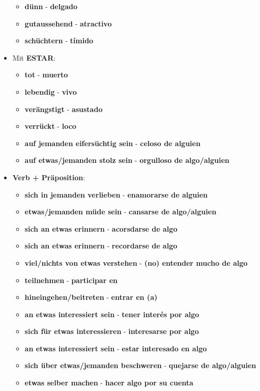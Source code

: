 \documentclass{article}
\begin{document}
\begin{multicols}{2}
\begin{itemize}
\begin{itemize}
			\item{\textbf{dünn} - \textbf{delgado}}
			\item{\textbf{gutaussehend} - \textbf{atractivo}}
			\item{\textbf{schüchtern} - \textbf{tímido}}
		\end{itemize}
		\item{Mit \textbf{ESTAR}:}
		\begin{itemize}
			\item{\textbf{tot} - \textbf{muerto}}
			\item{\textbf{lebendig} - \textbf{vivo}}
			\item{\textbf{verängstigt} - \textbf{asustado}}
			\item{\textbf{verrückt} - \textbf{loco}}
			\item{\textbf{auf jemanden eifersüchtig sein} - \textbf{celoso de alguien}}
			\item{\textbf{auf etwas/jemanden stolz sein} - \textbf{orgulloso de algo/alguien}}
		\end{itemize}
		\newpage
		\item{\textbf{Verb + Präposition}:}
		\begin{itemize}
			\item{\textbf{sich in jemanden verlieben} - \textbf{enamorarse de alguien}}
			\item{\textbf{etwas/jemanden müde sein} - \textbf{cansarse de algo/alguien}}
			\item{\textbf{sich an etwas erinnern} - \textbf{acorsdarse de algo}}
			\item{\textbf{sich an etwas erinnern} - \textbf{recordarse de algo}}
			\item{\textbf{viel/nichts von etwas verstehen} - \textbf{(no) entender mucho de algo}}
			\item{\textbf{teilnehmen} - \textbf{participar en}}
			\item{\textbf{hineingehen/beitreten} - \textbf{entrar en (a)}}
			\item{\textbf{an etwas interessiert sein} - \textbf{tener interés por algo}}
			\item{\textbf{sich für etwas interessieren} - \textbf{interesarse por algo}}
			\item{\textbf{an etwas interessiert sein} - \textbf{estar interesado en algo}}
			\item{\textbf{sich über etwas/jemanden beschweren} - \textbf{quejarse de algo/alguien}}
			\item{\textbf{etwas selber machen} - \textbf{hacer algo por su cuenta}}

\end{itemize}
\end{itemize}
\end{multicols}
\end{document}
